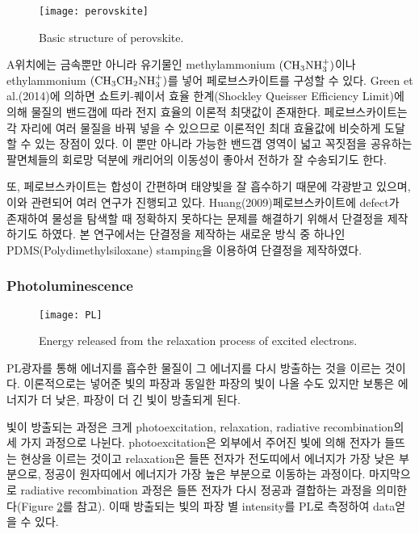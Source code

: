 \begin{figure}[H]
	\begin{center}
			\texttt{[image: perovskite]}
	\end{center}
	\caption{Basic structure of perovskite.}
	\label{fig:perov} 
\end{figure}

A위치에는 금속뿐만 아니라 유기물인  methylammonium $\rm(CH_3NH_3^+)$이나 ethylammonium $\rm(CH_3CH_2NH_3^+)$를 넣어 페로브스카이트를 구성할 수 있다. Green et al.(2014)에 의하면 쇼트키-퀘이서 효율 한계(Shockley Queisser Efficiency Limit)에 의해 물질의 밴드갭에 따라 전지 효율의 이론적 최댓값이 존재한다\cite{green2014emergence}. 페로브스카이트는 각 자리에 여러 물질을 바꿔 넣을 수 있으므로 이론적인 최대 효율값에 비슷하게 도달할 수  있는 장점이 있다. 이 뿐만 아니라 가능한 밴드갭 영역이 넓고 꼭짓점을 공유하는 팔면체들의 회로망 덕분에 캐리어의 이동성이 좋아서 전하가 잘 수송되기도 한다\cite{green2014emergence}.

또, 페로브스카이트는 합성이 간편하며 태양빛을 잘 흡수하기 때문에 각광받고 있으며, 이와 관련되어 여러 연구가 진행되고 있다. Huang(2009)\은 페로브스카이트에 defect가 존재하여 물성을 탐색할 때 정확하지 못하다는 문제를 해결하기 위해서 단결정을 제작하기도 하였다\cite{huang2009fabrication}. 본 연구에서는 단결정을 제작하는 새로운 방식 중 하나인 PDMS(Polydimethylsiloxane) stamping을 이용하여 단결정을 제작하였다.
\\

\subsubsection{Photoluminescence}

\begin{figure}[H]
	\begin{center}
			\texttt{[image: PL]}
	\end{center}
	\caption{Energy released from the relaxation process of excited electrons.}
	\label{fig:pl} 
\end{figure}

PL\는 광자를 통해 에너지를 흡수한 물질이 그 에너지를 다시 방출하는 것을 이르는 것이다. 이론적으로는 넣어준 빛의 파장과 동일한 파장의 빛이 나올 수도 있지만 보통은 에너지가 더 낮은, 파장이 더 긴 빛이 방출되게 된다. 

빛이 방출되는 과정은 크게 photoexcitation, relaxation, radiative recombination의 세 가지 과정으로 나뉜다. photoexcitation은 외부에서 주어진 빛에 의해 전자가 들뜨는 현상을 이르는 것이고 relaxation은 들뜬 전자가 전도띠에서 에너지가 가장 낮은 부분으로, 정공이 원자띠에서 에너지가 가장 높은 부분으로 이동하는 과정이다. 마지막으로 radiative recombination 과정은 들뜬 전자가 다시 정공과 결합하는 과정을 의미한다(Figure \ref{fig:pl}를 참고). 이때 방출되는 빛의 파장 별 intensity를 PL로 측정하여 data\를 얻을 수 있다.
\\

